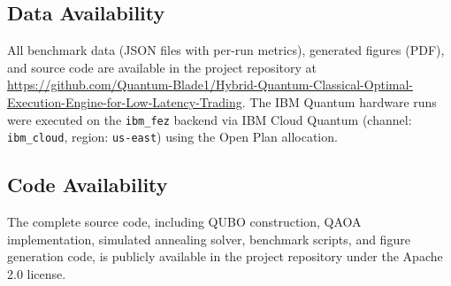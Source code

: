 \documentclass[11pt]{article}
\begin{document}
\subsection*{Data Availability}
All benchmark data (JSON files with per-run metrics), generated figures (PDF), and source code are available in the project repository at \url{https://github.com/Quantum-Blade1/Hybrid-Quantum-Classical-Optimal-Execution-Engine-for-Low-Latency-Trading}. The IBM Quantum hardware runs were executed on the \texttt{ibm\_fez} backend via IBM Cloud Quantum (channel: \texttt{ibm\_cloud}, region: \texttt{us-east}) using the Open Plan allocation.

\subsection*{Code Availability}
The complete source code, including QUBO construction, QAOA implementation, simulated annealing solver, benchmark scripts, and figure generation code, is publicly available in the project repository under the Apache 2.0 license.
\end{document}
